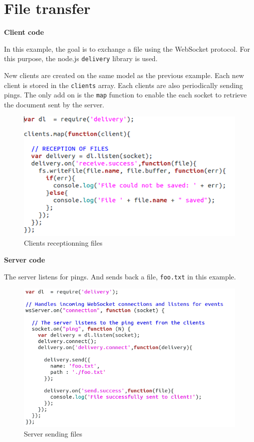 \section{File transfer}

\textbf{Client code}

In this example, the goal is to exchange a file using the WebSocket protocol.
For this purpose, the node.js \texttt{delivery} library is used.

New clients are created on the same model as the previous example. Each new
client is stored in the \texttt{clients} array. Each clients are also
periodically sending pings. The only add on is the \texttt{map} function to
enable the each socket to retrieve the document sent by the server. 

\begin{figure}[H] \centering
  \includegraphics[width=\textwidth]{./Figures/WS_client_delivery.png}
\caption[Client code for file transfers with WebSocket ]{Clients receptionning files} 
\label{fig:WS_client_delivery}
\end{figure}

\textbf{Server code}

The server listens for pings. And sends back a file, \texttt{foo.txt} in this
example.

\begin{figure}[H]
	\centering
    \includegraphics[width=\textwidth]{./Figures/WS_server_delivery.png}
	\caption[Server code for file transfers with Websocket]{Server sending files}
	\label{fig:WS_server_delivery}
\end{figure}

